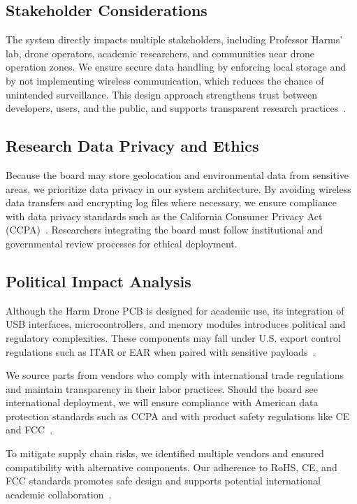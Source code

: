 \documentclass[12pt]{article}
\begin{document}
\subsection{Stakeholder Considerations}

The system directly impacts multiple stakeholders, including Professor Harms' lab, drone operators, academic researchers, and communities near drone operation zones. We ensure secure data handling by enforcing local storage and by not implementing wireless communication, which reduces the chance of unintended surveillance. This design approach strengthens trust between developers, users, and the public, and supports transparent research practices~\cite{parrot2023}.

\subsection{Research Data Privacy and Ethics}

Because the board may store geolocation and environmental data from sensitive areas, we prioritize data privacy in our system architecture. By avoiding wireless data transfers and encrypting log files where necessary, we ensure compliance with data privacy standards such as the California Consumer Privacy Act (CCPA)~\cite{microchip2023}. Researchers integrating the board must follow institutional and governmental review processes for ethical deployment.

\subsection{Political Impact Analysis}

Although the Harm Drone PCB is designed for academic use, its integration of USB interfaces, microcontrollers, and memory modules introduces political and regulatory complexities. These components may fall under U.S. export control regulations such as ITAR or EAR when paired with sensitive payloads~\cite{itar}.

We source parts from vendors who comply with international trade regulations and maintain transparency in their labor practices. Should the board see international deployment, we will ensure compliance with American data protection standards such as CCPA and with product safety regulations like CE and FCC~\cite{ti2023b,microchip2023}.

To mitigate supply chain risks, we identified multiple vendors and ensured compatibility with alternative components. Our adherence to RoHS, CE, and FCC standards promotes safe design and supports potential international academic collaboration~\cite{ti2023b}.
\end{document}
